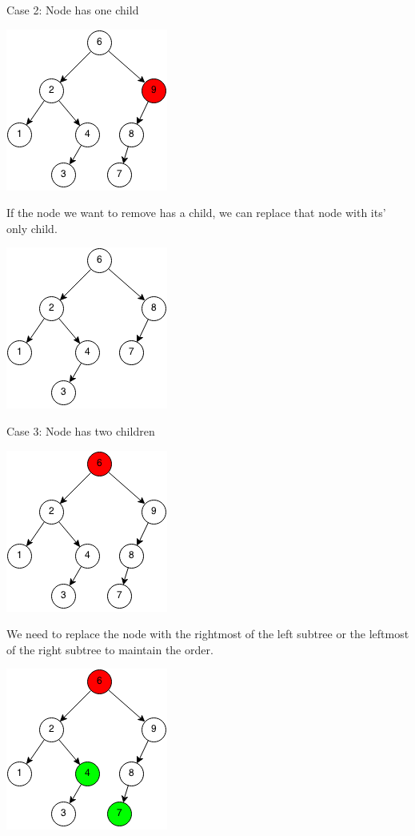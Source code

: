 \documentclass[11pt,oneside]{book}
\makeatletter
\def\maxwidth#1{\ifdim\Gin@nat@width>#1 #1\else\Gin@nat@width\fi}
\makeatother
\begin{document}
Case 2: Node has one child

\includegraphics[width=\maxwidth{\textwidth}]{bst-rem-case21.png}

If the node we want to remove has a child, we can replace that node with its' only child.

\includegraphics[width=\maxwidth{\textwidth}]{bst-rem-case22.png}

Case 3: Node has two children

\includegraphics[width=\maxwidth{\textwidth}]{bst-rem-case31.png}

We need to replace the node with the rightmost of the left subtree or the leftmost of the right subtree to maintain the order.

\includegraphics[width=\maxwidth{\textwidth}]{bst-rem-case32.png}
\end{document}
